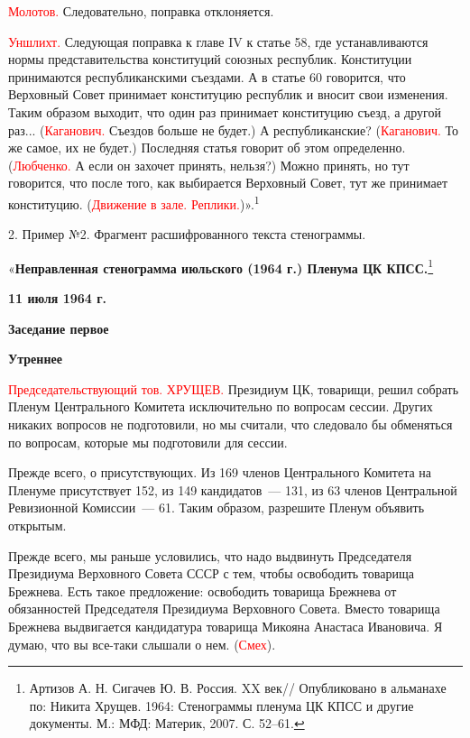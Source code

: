 \documentclass{kursa4}
\begin{document}
{{    \textcolor{red}{Молотов.}{
    Следовательно, поправка отклоняется.}

    \textcolor{red}{Уншлихт.}{
    Следующая поправка к главе IV к статье 58, где устанавливаются нормы
    представительства конституций союзных республик. Конституции
    принимаются республиканскими съездами. А в статье 60 говорится, что
    Верховный Совет принимает конституцию республик и вносит свои
    изменения. Таким образом выходит, что один раз принимает конституцию
    съезд, а другой раз...
    (}\textcolor{red}{Каганович.}{
    Съездов больше не будет.) А республиканские?
    (}\textcolor{red}{Каганович.}{
    То же самое, их не будет.) Последняя статья говорит об этом
    определенно.
    (}\textcolor{red}{Любченко.}{
    А если он захочет принять, нельзя?) Можно принять, но тут говорится,
    что после того, как выбирается Верховный Совет, тут же принимает
    конституцию.
    (}\textcolor{red}{Движение в зале.
    Реплики.}{)».}{\textsuperscript{1}}


    \bigskip

    2. Пример №2. Фрагмент расшифрованного текста стенограммы.


    \bigskip

    «\textbf{{Неправленная стенограмма июльского (1964 г.)
    Пленума ЦК КПСС.}}\footnote{ Артизов А. Н. Сигачев Ю. В. Россия. XX
    век// Опубликовано в альманахе по: Никита Хрущев. 1964: Стенограммы
    пленума ЦК КПСС и другие документы. М.: МФД: Материк, 2007. С. 52–61.}

    \textbf{{11 июля 1964 г.}}

    \textbf{{Заседание первое}}

    \textbf{{Утреннее}}

    \textcolor{red}{Председательствующий тов.
    ХРУЩЕВ.}{ Президиум ЦК, товарищи, решил собрать Пленум
    Центрального Комитета исключительно по вопросам сессии. Других никаких
    вопросов не }{подготовили, но мы считали, что
    следовало бы обменяться по вопросам, которые мы подготовили для
    сессии.}

    {Прежде всего, о присутствующих. Из 169 членов
    Центрального Комитета на Пленуме присутствует 152, из 149 кандидатов~---
    131, из 63 членов Центральной Ревизионной Комиссии~--- 61. Таким образом,
    разрешите Пленум объявить открытым.}

    {Прежде всего, мы раньше условились, что надо выдвинуть
    Председателя Президиума Верховного Совета СССР с тем, чтобы освободить
    товарища Брежнева. Есть такое предложение: освободить товарища Брежнева
    от обязанностей Председателя Президиума Верховного Совета. Вместо
    товарища Брежнева выдвигается кандидатура товарища Микояна Анастаса
    Ивановича. Я думаю, что вы все-таки слышали о нем.
    (}\textcolor{red}{Смех}{).}

}}
\end{document}
